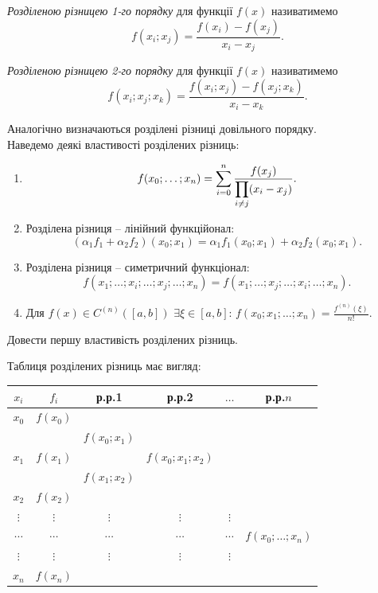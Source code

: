 \textit{Розділеною різницею 1-го порядку} для функції $f(x)$ називатимемо 
\[ f(x_i; x_j) = \dfrac{f(x_i)-f(x_j)}{x_i-x_j}. \]

\textit{Розділеною різницею 2-го порядку} для функції $f(x)$ називатимемо 
\[ f(x_i; x_j; x_k) = \dfrac{f(x_i;x_j)-f(x_j;x_k)}{x_i-x_k}. \]

Аналогічно визначаються розділені різниці довільного порядку. \\

Наведемо деякі властивості розділених різниць:
\begin{enumerate}
    \item \[f(x_0; \ldots; x_n) = \displaystyle\sum\limits_{i=0}^n \dfrac{f(x_j)}{\displaystyle\prod\limits_{i\ne j}(x_i-x_j)}.\]

    \item Розділена різниця -- лінійний функційонал:
    \[ (\alpha_1 f_1 + \alpha_2 f_2)(x_0; x_1) = \alpha_1 f_1(x_0;x_1) + \alpha_2 f_2(x_0;x_1). \]

    \item Розділена різниця -- симетричний функціонал:
    \[ f(x_1; \ldots; x_i; \ldots; x_j; \ldots; x_n) = f(x_1; \ldots; x_j; \ldots; x_i; \ldots; x_n). \]

    \item Для $f(x) \in C^{(n)}([a,b])$ $\exists \xi \in [a,b]$: $f(x_0; x_1; \ldots; x_n) = \frac{f^{(n)}(\xi)}{n!}$.
\end{enumerate}

\begin{problem}
    Довести першу властивість розділених різниць.
\end{problem}

Таблиця розділених різниць має вигляд:
\begin{table}[H]
    \centering
    \begin{tabular}{c|ccccc}
        $x_i$ & $f_i$ & р.р.1 & р.р.2 & $\ldots$ & р.р.$n$ \\ \hline
        $x_0$ & $f(x_0)$ & & & & \\
        & & $f(x_0;x_1)$ & & & \\
        $x_1$ & $f(x_1)$ & & $f(x_0;x_1;x_2)$ & & \\
        & & $f(x_1;x_2)$ & & & \\
        $x_2$ & $f(x_2)$ & & & & \\
        $\vdots$ & $\vdots$ & $\vdots$ & $\vdots$ & $\vdots$ & \\
        $\cdots$ & $\cdots$ & $\cdots$ & $\cdots$ & $\cdots$ & $f(x_0;\ldots;x_n)$ \\
        $\vdots$ & $\vdots$ & $\vdots$ & $\vdots$ & $\vdots$ & \\
        $x_n$ & $f(x_n)$ & & & & \\
    \end{tabular}
\end{table}

